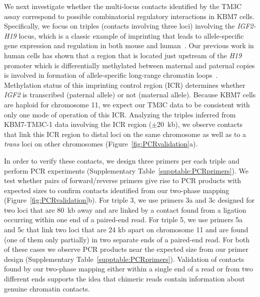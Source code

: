 We next investigate whether the multi-locus contacts identified by the TM3C
assay correspond to possible combinatorial regulatory interactions in
KBM7 cells. Specifically, we focus on triples (contacts involving three loci)
involving the \emph{IGF2-H19} locus, which is a classic example of imprinting that
leads to allele-specific gene expression and regulation in both mouse and
human~\citep{bartolomei:parental, ling:ctcf, vu:loss, murrell:interaction}.
Our previous work in human cells
has shown that a region that is located just upstream of the \emph{H19} promoter
which is differentially methylated between maternal and paternal copies is involved
in formation of allele-specific long-range chromatin loops~\citep{vu:loss}.
Methylation status of this imprinting control
region (ICR) determines whether \emph{IGF2} is transcribed (paternal allele)
or not (maternal allele). Because KBM7 cells are haploid for chromosome 11, we
expect our TM3C data to be consistent with only one mode of operation of
this ICR. Analyzing the triples inferred from KBM7-TM3C-1 data involving
the ICR region ($\pm$20~kb), we observe contacts that link this ICR region
to distal loci on the same chromosome as well as to a {\em trans} loci on
other chromosomes (Figure~\ref{fig:PCRvalidation}a).

In order to verify
these contacts, we design three primers per each triple and perform PCR
experiments (Supplementary Table~\ref{supptable:PCRprimers}).
We test whether pairs of forward/reverse primers give rise to PCR
products with expected sizes to confirm contacts identified from our
two-phase mapping (Figure~\ref{fig:PCRvalidation}b). For triple 3, we use
primers 3a and 3c designed for two loci that are 80~kb away and are linked by a
contact found from a ligation occurring within one end of a paired-end read.
For triple 5, we use primers 5a and 5c that link two loci that are 24 kb
apart on chromosome 11 and are found (one of them only partially) in two
separate ends of a paired-end read. For both of these cases we observe
PCR products near the expected size from our primer design (Supplementary Table~\ref{supptable:PCRprimers}).
Validation of contacts found by our two-phase mapping either within a
single end of a read or from two different ends supports the idea that
chimeric reads contain information about genuine chromatin contacts.

